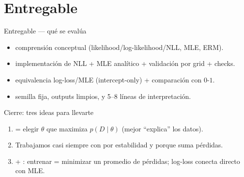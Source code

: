 \section[Entregable]{Entregable\label{sec:entregable}}

\begin{frame}{Entregable — qué se evalúa}
\begin{itemize}
  \item {} comprensión conceptual (likelihood/log-likelihood/NLL, MLE, ERM).
  \item {} implementación de NLL + MLE analítico + validación por grid + checks.
  \item {} equivalencia log-loss/MLE (intercept-only) + comparación con \(0\text{-}1\).
  \item {} semilla fija, outputs limpios, y 5–8 líneas de interpretación.
\end{itemize}
\end{frame}

\begin{frame}{Cierre: tres ideas para llevarte}
\begin{enumerate}
  \item {} = elegir \(\theta\) que maximiza \(p(D\mid\theta)\) (mejor “explica” los datos). \hfill {}
  \item Trabajamos casi siempre con  por estabilidad y porque suma pérdidas. \hfill {}
  \item {} + : entrenar = minimizar un promedio de pérdidas; log-loss conecta directo con MLE. \hfill {}
\end{enumerate}
\end{frame}

